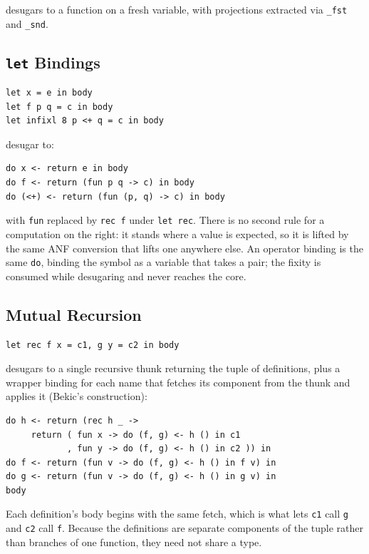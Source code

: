 \documentclass[11pt,a4paper]{article}
\newcommand{\cba}[1]{\lstinline[style=cbainline]{#1}}
\begin{document}
desugars to a function on a fresh variable, with projections extracted via
\cba{_fst} and \cba{_snd}.

\subsection{\texttt{let} Bindings}

\begin{lstlisting}
let x = e in body
let f p q = c in body
let infixl 8 p <+ q = c in body
\end{lstlisting}

desugar to:

\begin{lstlisting}
do x <- return e in body
do f <- return (fun p q -> c) in body
do (<+) <- return (fun (p, q) -> c) in body
\end{lstlisting}

with \cba{fun} replaced by \cba{rec f} under \cba{let rec}.  There is no second
rule for a computation on the right: it stands where a value is expected, so it
is lifted by the same ANF conversion that lifts one anywhere else.  An operator
binding is the same \cba{do}, binding the symbol as a variable that takes a
pair; the fixity is consumed while desugaring and never reaches the core.

\subsection{Mutual Recursion}

\begin{lstlisting}
let rec f x = c1, g y = c2 in body
\end{lstlisting}

desugars to a single recursive thunk returning the tuple of definitions, plus
a wrapper binding for each name that fetches its component from the thunk and
applies it (Bekic's construction):

\begin{lstlisting}
do h <- return (rec h _ ->
     return ( fun x -> do (f, g) <- h () in c1
            , fun y -> do (f, g) <- h () in c2 )) in
do f <- return (fun v -> do (f, g) <- h () in f v) in
do g <- return (fun v -> do (f, g) <- h () in g v) in
body
\end{lstlisting}

Each definition's body begins with the same fetch, which is what lets
\texttt{c1} call \texttt{g} and \texttt{c2} call \texttt{f}.  Because the
definitions are separate components of the tuple rather than branches of one
function, they need not share a type.
\end{document}
